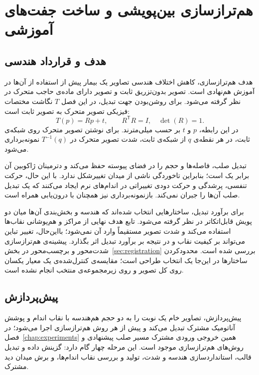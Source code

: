 \section{هم‌ترازسازی بین‌پویشی و ساخت جفت‌های آموزشی}
\label{sec:m-reg}

\subsection{هدف و قرارداد هندسی}
\label{sec:m-reg-goal}
\label{sec:m-reg-idea}
\label{sec:m-reg-related}

هدف هم‌ترازسازی، کاهش اختلاف هندسی تصاویر یک بیمار پیش از استفاده از آن‌ها در آموزش هم‌نهادی است. تصویر بدون‌تزریق ثابت و تصویر دارای ماده‌ی حاجب متحرک در نظر گرفته می‌شود. برای روشن‌بودن جهت تبدیل، در این فصل $T$ نگاشت مختصات فیزیکی تصویر متحرک به تصویر ثابت است:
\begin{equation}
T(p)=Rp+t,\qquad R^{\mathsf T}R=I,\quad \det(R)=1.
\label{eq:m-rigid-transform}
\end{equation}
در این رابطه، $p$ و $t$ بر حسب میلی‌مترند. برای نوشتن تصویر متحرک روی شبکه‌ی ثابت، در هر نقطه‌ی $q$ از شبکه‌ی ثابت، شدت تصویر متحرک در $T^{-1}(q)$ نمونه‌برداری می‌شود.

تبدیل صلب، فاصله‌ها و حجم را در فضای پیوسته حفظ می‌کند و دترمینان ژاکوبین آن برابر یک است؛ بنابراین تاخوردگی ناشی از میدان تغییرشکل ندارد. با این حال، حرکت تنفسی، پرشدگی و حرکت دودی تغییراتی در اندام‌های نرم ایجاد می‌کنند که یک تبدیل صلب آن‌ها را جبران نمی‌کند. بازنمونه‌برداری نیز همچنان با درون‌یابی همراه است.

برای برآورد تبدیل، ساختارهایی انتخاب شده‌اند که هندسه و بخش‌بندی آن‌ها میان دو پویش قابل‌اتکاتر در نظر گرفته می‌شود. تابع هدف نهایی از مراکز و هم‌پوشانی نقاب‌ها استفاده می‌کند و شدت تصویر مستقیماً وارد آن نمی‌شود؛ بااین‌حال، تغییر تباین می‌تواند بر کیفیت نقاب و در نتیجه بر برآورد تبدیل اثر بگذارد. پیشینه‌ی هم‌ترازسازی شدت‌محور و برچسب‌محور در بخش~\ref{sec:registration} بررسی شده است. محدودکردن ساختارها در این‌جا یک انتخاب طراحی است؛ مقایسه‌ی کنترل‌شده‌ی یک معیار یکسان روی کل تصویر و روی زیرمجموعه‌ی منتخب انجام نشده است.

\subsection{پیش‌پردازش}
\label{sec:m-reg-preproc}
\label{sec:m-reg-std}
\label{sec:m-reg-fov}

پیش‌پردازش، تصاویر خام یک نوبت را به دو حجم هم‌هندسه با نقاب اندام و پوشش آناتومیک مشترک تبدیل می‌کند و پیش از هر روش هم‌ترازسازی اجرا می‌شود؛ در فصل~\ref{chap:experiments} همین خروجی ورودی مشترک مسیر صلب پیشنهادی و روش‌های هم‌ترازسازی موجود است. این مرحله چهار گام دارد: گزینش داده و تبدیل قالب، استانداردسازی هندسه و شدت، تولید و بررسی نقاب اندام‌ها، و برش میدان دید مشترک.

